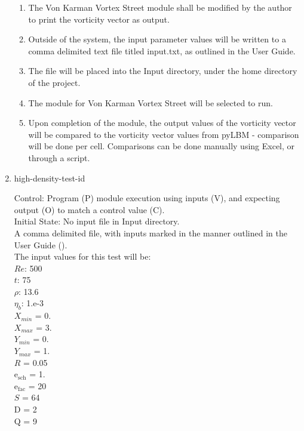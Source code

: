 \documentclass[12pt, titlepage]{article}
\newcounter{testcounter} %
\begin{document}
\begin{enumerate}
\begin{enumerate}
\item The Von Karman Vortex Street module shall be modified by the author to
  print the vorticity vector as output.
\item Outside of the system, the input parameter values will be written to a
  comma delimited text file titled input.txt, as outlined in the User Guide.
\item The file will be placed into the Input directory, under the home directory of the project.
\item The module for Von Karman Vortex Street will be selected to run.
\item Upon completion of the module, the output values of the vorticity vector
  will be compared to the vorticity vector values from pyLBM - comparison will
  be done per cell. Comparisons can be done manually using Excel, or through a
  script.
\end{enumerate}

\item{high-density-test-id\thetestcounter \\}

Control: Program (P) module execution using inputs (V), and expecting output (O)
to match a control value (C).\\

Initial State: No input file in Input directory.\\
					
A comma delimited file, with inputs marked in the manner outlined in the User
Guide (\citet{LBM_UserGuide_PM}).\\The input values for this test will be:\\
$Re$: 500\\
$t$: 75\\
$\rho$: 13.6\\
$\eta_b$: 1.e-3\\
$X_{min}$ = 0.\\
$X_{max}$ = 3.\\
$Y_{min}$ = 0.\\
$Y_{max}$ = 1.\\
$R$ = 0.05\\
$\mathrm{e_{sch}}$ = 1.\\
$\mathrm{e_{fac}}$ = 20\\
$S$ = 64\\
$\mathrm{D}$ = 2\\
$\mathrm{Q}$ = 9\\


\end{enumerate}
\end{document}
